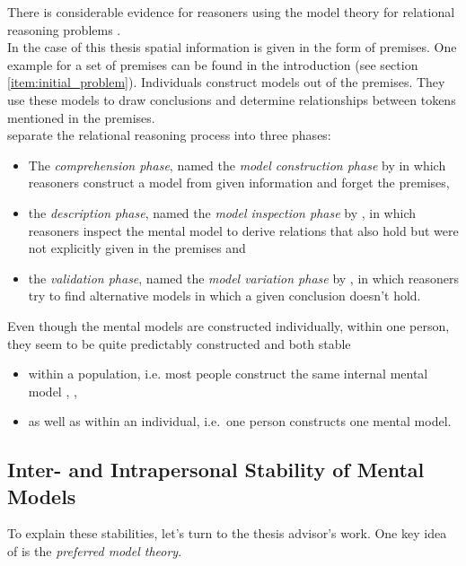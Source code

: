\documentclass[hidelinks]{scrartcl}
\begin{document}
There is considerable evidence for reasoners using the model theory for relational reasoning problems \citep{Schaeken.2007}. \\


In the case of this thesis spatial information is given in the form of \gls{premise}s. One example for a set of \gls{premise}s can be found in the introduction (see section \ref{item:initial_problem}). Individuals construct models out of the \gls{premise}s. They use these models to draw \gls{conclusion}s and determine relationships between \gls{token}s mentioned in the \gls{premise}s. \\

\citet{Johnson-Laird.1991} separate the relational reasoning process into three phases:
\begin{itemize}
\item The \textit{comprehension phase}, named the \textit{model construction phase} by \cite{Ragni.2013} in which reasoners construct a model from given information and forget the \gls{premise}s,
\item the \textit{description phase}, named the \textit{model inspection phase} by \cite{Ragni.2013}, in which reasoners inspect the mental model to derive relations that also hold but were not explicitly given in the \gls{premise}s and
\item the \textit{validation phase}, named the \textit{model variation phase} by \cite{Ragni.2013}, in which reasoners try to find alternative models in which a given \gls{conclusion} doesn't hold.
\end{itemize}

\noindent Even though the \gls{mental model}s are constructed individually, within one person, they seem to be quite predictably constructed and both stable
\begin{itemize}
\item within a population, i.e. most people construct the same internal \gls{mental model} \citep{Ragni.2013}, \citep{Knauff.2013}, \citep{Rauh.2005}
\item as well as within an individual, i.e.\ one person constructs one \gls{mental model}. \citep{Goodwin.2005}
\end{itemize}

\subsection{Inter- and Intrapersonal Stability of Mental Models}
To explain these stabilities, let's turn to the thesis advisor's work. One key idea of \cite{Ragni.2013} is the \textit{preferred model theory}.
\end{document}
